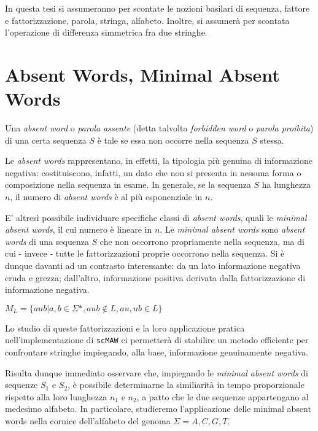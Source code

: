 In questa tesi si assumeranno per scontate le nozioni basilari di sequenza, fattore e fattorizzazione, parola, stringa, alfabeto. Inoltre, si assumerà per scontata l'operazione di differenza simmetrica fra due stringhe.

\section{Absent Words, Minimal Absent Words}

Una \textit{absent word} o \textit{parola assente} (detta talvolta \textit{forbidden word} o \textit{parola proibita}) di una certa sequenza $S$ è tale se essa non occorre nella sequenza $S$ stessa. 

Le \textit{absent words} rappresentano, in effetti, la tipologia più genuina di informazione negativa: costituiscono, infatti, un dato che non si presenta in nessuna forma o composizione nella sequenza in esame. In generale, se la sequenza $S$ ha lunghezza $n$, il numero di \textit{absent words} è al più esponenziale in $n$. 

\vspace{3mm}

E' altresì possibile individuare specifiche classi di \textit{absent words}, quali le \textit{minimal absent words}, il cui numero è lineare in $n$. Le \textit{minimal absent words} sono \textit{absent words} di una sequenza $S$ che non occorrono propriamente nella sequenza, ma di cui - invece - tutte le fattorizzazioni proprie occorrono nella sequenza. Si è dunque davanti ad un contrasto interessante: da un lato informazione negativa cruda e grezza; dall'altro, informazione positiva derivata dalla fattorizzazione di informazione negativa. 

\(M_L = \{aub | a,b \in \Sigma*, aub\not\in L, au,ub\in L\} \)

Lo studio di queste fattorizzazioni e la loro applicazione pratica nell'implementazione di \verb|scMAW| ci permetterà di stabilire un metodo efficiente per confrontare stringhe impiegando, alla base, informazione genuinamente negativa.

\vspace{3mm}

Risulta dunque immediato osservare che, impiegando le \textit{minimal absent words} di sequenze $S_1$ e $S_2$, è possibile determinarne la similiarità in tempo proporzionale rispetto alla loro lunghezza $n_1$ e $n_2$, a patto che le due sequenze appartengano al medesimo alfabeto. In particolare, studieremo l'applicazione delle minimal absent words nella cornice dell'alfabeto del genoma $\Sigma={A, C, G, T}$.

